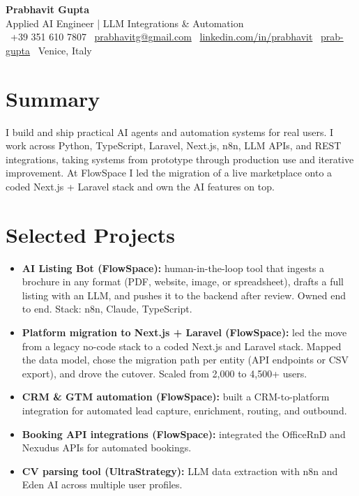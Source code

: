 \documentclass[a4paper,7pt]{article}
\begin{document}
\renewcommand{\baselinestretch}{0.72}\small\normalsize

\begin{center}
 {\Huge\bfseries Prabhavit Gupta}\\[3pt]
 {\color{accent}\large Applied AI Engineer | LLM Integrations \& Automation}\\[5pt]
 \faPhone\ +39 351 610 7807 \quad
 \faEnvelope\ \href{mailto:prabhavitg@gmail.com}{prabhavitg@gmail.com} \quad
 \faLinkedin\ \href{https://www.linkedin.com/in/prabhavit/}{linkedin.com/in/prabhavit} \quad
 \faGithub\ \href{https://github.com/prab-gupta}{prab-gupta} \quad
 \faMapMarker*\ Venice, Italy
\end{center}

\section{Summary}
I build and ship practical AI agents and automation systems for real users. I work across Python, TypeScript, Laravel, Next.js, n8n, LLM APIs, and REST integrations, taking systems from prototype through production use and iterative improvement. At FlowSpace I led the migration of a live marketplace onto a coded Next.js + Laravel stack and own the AI features on top.

\section{Selected Projects}
\begin{itemize}
 \item \textbf{AI Listing Bot (FlowSpace):} human-in-the-loop tool that ingests a brochure in any format (PDF, website, image, or spreadsheet), drafts a full listing with an LLM, and pushes it to the backend after review. Owned end to end. Stack: n8n, Claude, TypeScript.
 \item \textbf{Platform migration to Next.js + Laravel (FlowSpace):} led the move from a legacy no-code stack to a coded Next.js and Laravel stack. Mapped the data model, chose the migration path per entity (API endpoints or CSV export), and drove the cutover. Scaled from 2,000 to 4,500+ users.
 \item \textbf{CRM \& GTM automation (FlowSpace):} built a CRM-to-platform integration for automated lead capture, enrichment, routing, and outbound.
 \item \textbf{Booking API integrations (FlowSpace):} integrated the OfficeRnD and Nexudus APIs for automated bookings.
 \item \textbf{CV parsing tool (UltraStrategy):} LLM data extraction with n8n and Eden AI across multiple user profiles.
\end{itemize}
\end{document}
